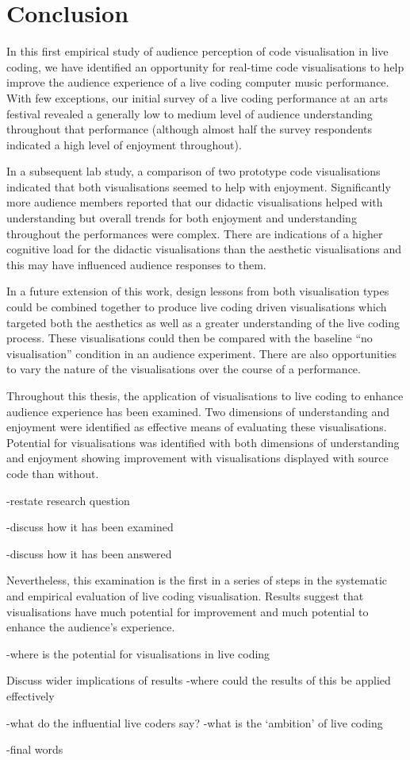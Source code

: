 
\chapter{Conclusion}
\label{chap:conclusion}

In this first empirical study of audience perception of code visualisation in live coding, we have identified an opportunity for real-time code visualisations to help improve the audience experience of a live coding computer music performance. With few exceptions, our initial survey of a live coding performance at an arts festival revealed a generally low to medium level of audience understanding throughout that performance (although almost half the survey respondents indicated a high level of enjoyment throughout).

In a subsequent lab study, a comparison of two prototype code visualisations indicated that both visualisations seemed to help with enjoyment. Significantly more audience members reported that our didactic visualisations helped with understanding but overall trends for both enjoyment and understanding throughout the performances were complex. There are indications of a higher cognitive load for the didactic visualisations than the aesthetic visualisations and this may have influenced audience responses to them.

In a future extension of this work, design lessons from both visualisation types could be combined together to produce live coding driven visualisations which targeted both the aesthetics as well as a greater understanding of the live coding process. These visualisations could then be compared with the baseline ``no visualisation'' condition in an audience experiment. There are also opportunities to vary the nature of the visualisations over the course of a performance.

Throughout this thesis, the application of visualisations to live coding to enhance audience experience has been examined. Two dimensions of understanding and enjoyment were identified as effective means of evaluating these visualisations. Potential for visualisations was identified with both dimensions of understanding and enjoyment showing improvement with visualisations displayed with source code than without.

-restate research question

-discuss how it has been examined

-discuss how it has been answered

Nevertheless, this examination is the first in a series of steps in the systematic and empirical evaluation of live coding visualisation. Results suggest that visualisations have much potential for improvement and much potential to enhance the audience's experience.

-where is the potential for visualisations in live coding

Discuss wider implications of results
-where could the results of this be applied effectively 

-what do the influential live coders say?
-what is the `ambition' of live coding

-final words
